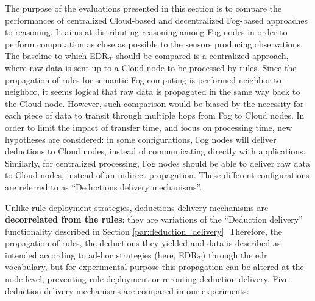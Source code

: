 \documentclass{iosart2c}
\newcommand{\edrt}{EDR$_{\mathcal{T}}$\xspace}
\begin{document}
The purpose of the evaluations presented in this section is to compare the performances of centralized Cloud-based and decentralized Fog-based approaches to reasoning.
It aims at distributing reasoning among Fog nodes in order to perform computation as close as possible to the sensors producing observations.
The baseline to which \edrt should be compared is a centralized approach, where raw data is sent up to a Cloud node to be processed by rules.
Since the propagation of rules for semantic Fog computing is performed neighbor-to-neighbor, it seems logical that raw data is propagated in the same way back to the Cloud node.
However, such comparison would be biased by the necessity for each piece of data to transit through multiple hops from Fog to Cloud nodes.
In order to limit the impact of transfer time, and focus on processing time, new hypotheses are considered: in some configurations, Fog nodes will deliver deductions to Cloud nodes, instead of communicating directly with applications.
Similarly, for centralized processing, Fog nodes should be able to deliver raw data to Cloud nodes, instead of an indirect propagation.
These different configurations are referred to as ``Deductions delivery mechanisms''.

Unlike rule deployment strategies, deductions delivery mechanisms are \textbf{decorrelated from the rules}: they are variations of the ``Deduction delivery'' functionality described in Section \textsection \ref{par:deduction_delivery}.
Therefore, the propagation of rules, the deductions they yielded and data is described as intended according to ad-hoc strategies (here, \edrt) through the \gls{edr} vocabulary, but for experimental purpose this propagation can be altered at the node level, preventing rule deployment or rerouting deduction delivery.
Five deduction delivery mechanisms are compared in our experiments: 
\end{document}
